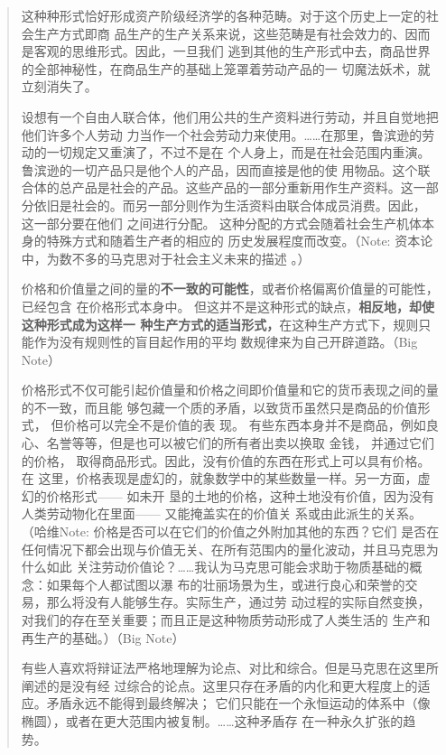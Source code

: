 \begin{quotation}
这种种形式恰好形成资产阶级经济学的各种范畴。对于这个历史上一定的社会生产方式即商
品生产的生产关系来说，这些范畴是有社会效力的、因而是客观的思维形式。因此，一旦我们
逃到其他的生产形式中去，商品世界的全部神秘性，在商品生产的基础上笼罩着劳动产品的一
切魔法妖术，就立刻消失了。

设想有一个自由人联合体，他们用公共的生产资料进行劳动，并且自觉地把他们许多个人劳动
力当作一个社会劳动力来使用。……在那里，鲁滨逊的劳动的一切规定又重演了，不过不是在
个人身上，而是在社会范围内重演。鲁滨逊的一切产品只是他个人的产品，因而直接是他的使
用物品。这个联合体的总产品是社会的产品。这些产品的一部分重新用作生产资料。这一部
分依旧是社会的。而另一部分则作为生活资料由联合体成员消费。因此， 这一部分要在他们
之间进行分配。 这种分配的方式会随着社会生产机体本身的特殊方式和随着生产者的相应的
历史发展程度而改变。（Note: 资本论中，为数不多的马克思对于社会主义未来的描述
。）

价格和价值量之间的量的\textbf{不一致的可能性}，或者价格偏离价值量的可能性，已经包含
在价格形式本身中。 但这并不是这种形式的缺点，\textbf{相反地，却使这种形式成为这样一
  种生产方式的适当形式，}在这种生产方式下，规则只能作为没有规则性的盲目起作用的平均
数规律来为自己开辟道路。（Big Note）

价格形式不仅可能引起价值量和价格之间即价值量和它的货币表现之间的量的不一致，而且能
够包藏一个质的矛盾，以致货币虽然只是商品的价值形式， 但价格可以完全不是价值的表
现。 有些东西本身并不是商品，例如良心、名誉等等，但是也可以被它们的所有者出卖以换取
金钱， 并通过它们的价格， 取得商品形式。因此，没有价值的东西在形式上可以具有价格。在
这里，价格表现是虚幻的，就象数学中的某些数量一样。另一方面，虚幻的价格形式—— 如未开
垦的土地的价格，这种土地没有价值，因为没有人类劳动物化在里面—— 又能掩盖实在的价值关
系或由此派生的关系。（哈维Note: 价格是否可以在它们的价值之外附加其他的东西？它们
是否在任何情况下都会出现与价值无关、在所有范围内的量化波动，并且马克思为什么如此
关注劳动价值论？……我认为马克思可能会求助于物质基础的概念：如果每个人都试图以瀑
布的壮丽场景为生，或进行良心和荣誉的交易，那么将没有人能够生存。实际生产，通过劳
动过程的实际自然变换，对我们的存在至关重要；而且正是这种物质劳动形成了人类生活的
生产和再生产的基础。）（Big Note）

有些人喜欢将辩证法严格地理解为论点、对比和综合。但是马克思在这里所阐述的是没有经
过综合的论点。这里只存在矛盾的内化和更大程度上的适应。矛盾永远不能得到最终解决；
它们只能在一个永恒运动的体系中（像椭圆），或者在更大范围内被复制。……这种矛盾存
在一种永久扩张的趋势。


\end{quotation}
